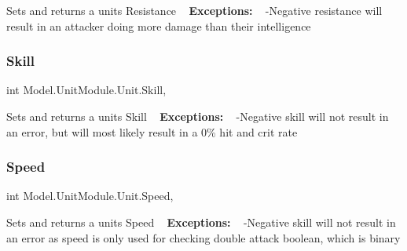 Sets and returns a unit\textquotesingle{}s Resistance ~\newline
 {\bfseries Exceptions\+:} ~\newline
 -\/\+Negative resistance will result in an attacker doing more damage than their intelligence \hypertarget{interface_model_1_1_unit_module_1_1_unit_a0a880a792432d9b3bbcab7bb7502a60b}{}\label{interface_model_1_1_unit_module_1_1_unit_a0a880a792432d9b3bbcab7bb7502a60b} 
\subsubsection{\texorpdfstring{Skill}{Skill}}
{\footnotesize\ttfamily int Model.\+Unit\+Module.\+Unit.\+Skill\hspace{0.3cm}{\ttfamily [get]}, {\ttfamily [set]}}

Sets and returns a unit\textquotesingle{}s Skill ~\newline
 {\bfseries Exceptions\+:} ~\newline
 -\/\+Negative skill will not result in an error, but will most likely result in a 0\% hit and crit rate \hypertarget{interface_model_1_1_unit_module_1_1_unit_a2ece6cbfd8d6df05edf6b24ffad2c0e8}{}\label{interface_model_1_1_unit_module_1_1_unit_a2ece6cbfd8d6df05edf6b24ffad2c0e8} 
\subsubsection{\texorpdfstring{Speed}{Speed}}
{\footnotesize\ttfamily int Model.\+Unit\+Module.\+Unit.\+Speed\hspace{0.3cm}{\ttfamily [get]}, {\ttfamily [set]}}

Sets and returns a unit\textquotesingle{}s Speed ~\newline
 {\bfseries Exceptions\+:} ~\newline
 -\/\+Negative skill will not result in an error as speed is only used for checking double attack boolean, which is binary \hypertarget{interface_model_1_1_unit_module_1_1_unit_a16473931cf7f2034db057631ad03aee8}{}\label{interface_model_1_1_unit_module_1_1_unit_a16473931cf7f2034db057631ad03aee8} 
